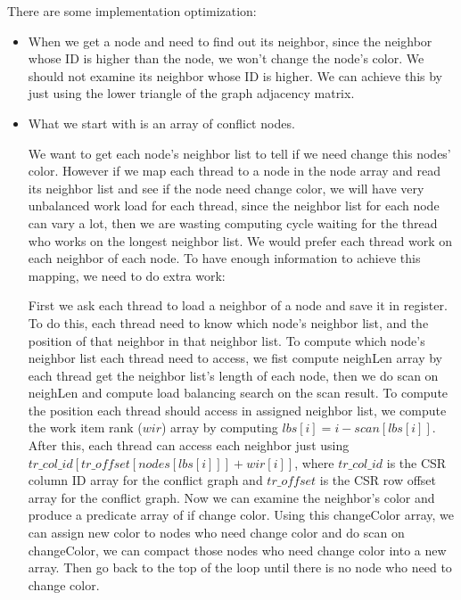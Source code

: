 \documentclass[12pt] {article}
\begin{document}
There are some implementation optimization:
\begin{itemize}
\item When we get a node and need to find out its neighbor, since the neighbor whose ID is higher than the node, we won't change the node's color. We should not examine its neighbor whose ID is higher. We can achieve this by just using the lower triangle of the graph adjacency matrix. 

\item What we start with is an array of conflict nodes.


We want to get each node's neighbor list to tell if we need change this nodes' color. However if we map each thread to a node in the node array and read its neighbor list and see if the node need change color, we will have very unbalanced work load for each thread, since the neighbor list for each node can vary a lot, then we are wasting computing cycle waiting for the thread who works on the longest neighbor list. We would prefer each thread work on each neighbor of each node. To have enough information to achieve this mapping, we need to do extra work:


First we ask each thread to load a neighbor of a node and save it in register. To do this, each thread need to know which node's neighbor list, and the position of that neighbor in that neighbor list. To compute which node's neighbor list each thread need to access, we fist compute neighLen array by each thread get the neighbor list's length of each node, then we do scan on neighLen and compute load balancing search on the scan result. To compute the position each thread should access in assigned neighbor list, we compute the work item rank ($wir$) array by computing $lbs[i]=i-scan[lbs[i]]$. After this, each thread can access each neighbor just using $tr\_col\_id[tr\_offset[nodes[lbs[i]]] + wir[i]]$, where $tr\_col\_id$ is the CSR column ID array for the conflict graph and $tr\_offset$ is the CSR row offset array for the conflict graph. Now we can examine the neighbor's color and produce a predicate array of if change color. Using this changeColor array, we can assign new color to nodes who need change color and do scan on changeColor, we can compact those nodes who need change color into a new array. Then go back to the top of the loop until there is no node who need to change color.

\end{itemize}
\end{document}
